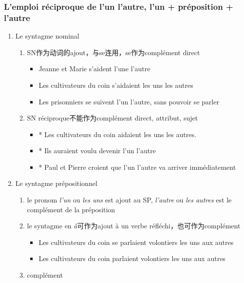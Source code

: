 \documentclass[UTF8]{report}
\begin{document}
\subsubsection{L’emploi réciproque de l’un l’autre, l’un + préposition + l’autre}
\begin{enumerate}
    \item Le syntagme nominal
    \begin{enumerate}
        \item SN作为动词的ajout，与se连用，se作为complément direct
        \begin{itemize}
            \item Jeanne et Marie s’aident l’une l’autre
            \item Les cultivateurs du coin s’aidaient les uns les autres 
            \item Les prisonniers se suivent l’un l’autre, sans pouvoir se parler
        \end{itemize}
        \item SN réciproque不能作为complément direct, attribut, sujet
        \begin{itemize}
            \item * Les cultivateurs du coin aidaient les uns les autres.
            \item * Ils auraient voulu devenir l’un l’autre
            \item * Paul et Pierre croient que l’un l’autre va arriver immédiatement
        \end{itemize}
    \end{enumerate}
    \item Le syntagme prépositionnel
    \begin{enumerate}
        \item le pronom \textit{l’un} ou \textit{les uns} est ajout au SP, \textit{l’autre} ou \textit{les autres} est le complément de la préposition
        \item le syntagme en \textit{à}可作为ajout à un verbe réfléchi，也可作为complément
        \begin{itemize}
            \item Les cultivateurs du coin se parlaient volontiers les uns aux autres
            \item Les cultivateurs du coin parlaient volontiers les uns aux autres
        \end{itemize}
        \item complément
        \begin{enumerate}

\end{enumerate}
\end{enumerate}
\end{enumerate}
\end{document}
